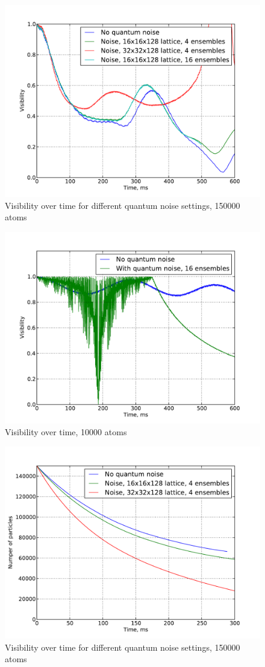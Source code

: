 \documentclass[12pt,notitlepage]{report}
\begin{document}
\begin{figure}
\includegraphics[width=4.5in]{visibility_150k.pdf}
\caption{Visibility over time for different quantum noise settings, 150000 atoms}
\label{visibility_noise}
\end{figure}

\begin{figure}
\includegraphics[width=4.5in]{visibility_10k.pdf}
\caption{Visibility over time, 10000 atoms}
\label{visibility_noise_10k}
\end{figure}

\begin{figure}
\includegraphics[width=4.5in]{particles_150k.pdf}
\caption{Visibility over time for different quantum noise settings, 150000 atoms}
\label{particle_number}
\end{figure}
\end{document}
